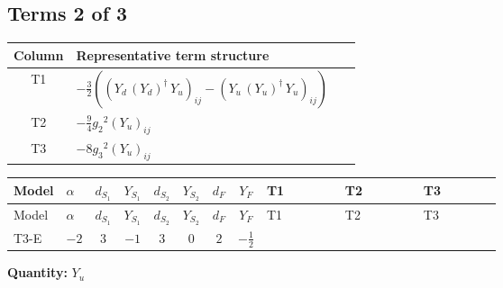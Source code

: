 \documentclass[8pt]{article}
\begin{document}
\begin{landscape}
\subsection*{Terms 2 of 3}
\begin{center}
\begin{tabular}{@{}c >{\raggedright\arraybackslash}p{0.82\linewidth}@{}}
\toprule
Column & Representative term structure \\
\midrule
T1 & \(\displaystyle -\frac{3}{2} (\left({Y_d}\,\left({Y_d}\right)^{\dagger}\,{Y_u}\right)_{ij}-\left({Y_u}\,\left({Y_u}\right)^{\dagger}\,{Y_u}\right)_{ij})\) \\
\midrule
T2 & \(\displaystyle -\frac{9}{4} {g_2}^2 \left({Y_u}\right)_{ij}\) \\
\midrule
T3 & \(\displaystyle -8 {g_3}^2 \left({Y_u}\right)_{ij}\) \\
\midrule
\bottomrule
\end{tabular}
\end{center}
\smallskip
\tiny
\begin{longtable}{@{}llcccccc >{\raggedright\arraybackslash}p{0.21\linewidth} >{\raggedright\arraybackslash}p{0.21\linewidth} >{\raggedright\arraybackslash}p{0.21\linewidth}@{}}
\toprule
Model & $\alpha$ & $d_{S_1}$ & $Y_{S_1}$ & $d_{S_2}$ & $Y_{S_2}$ & $d_F$ & $Y_F$ & T1 & T2 & T3 \\
\midrule
\endfirsthead
\toprule
Model & $\alpha$ & $d_{S_1}$ & $Y_{S_1}$ & $d_{S_2}$ & $Y_{S_2}$ & $d_F$ & $Y_F$ & T1 & T2 & T3 \\
\midrule
\endhead
T3-E & $-2$ & $3$ & $-1$ & $3$ & $0$ & $2$ & $-\frac{1}{2}$ & \scriptsize\adjustbox{max width=\linewidth}{$\begin{gathered} -\frac{3}{2} (\left({Y_d}\,\left({Y_d}\right)^{\dagger}\,{Y_u}\right)_{ij}-\left({Y_u}\,\left({Y_u}\right)^{\dagger}\,{Y_u}\right)_{ij})\end{gathered}$} & \scriptsize\adjustbox{max width=\linewidth}{$\begin{gathered} -\frac{9}{4} {g_2}^2 \left({Y_u}\right)_{ij}\end{gathered}$} & \scriptsize\adjustbox{max width=\linewidth}{$\begin{gathered} -8 {g_3}^2 \left({Y_u}\right)_{ij}\end{gathered}$} \\
\midrule
\bottomrule
\end{longtable}
\clearpage
\noindent\textbf{Quantity: }$Y_u$\par\smallskip

\end{landscape}
\end{document}
